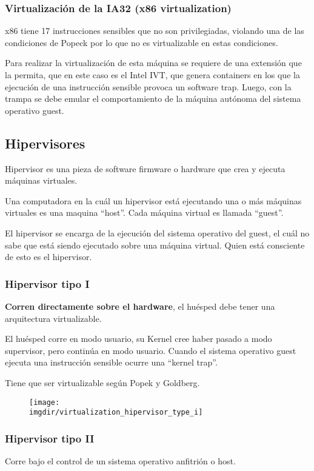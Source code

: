 \documentclass[a4paper, twoside]{article}
\newcommand{\imgdir}{../resources/images} %
\begin{document}
\subsubsection{Virtualización de la IA32 (x86 virtualization)}
x86 tiene 17 instrucciones sensibles que no son privilegiadas, violando una de las condiciones de Popeck por lo que no es virtualizable en estas condiciones.

Para realizar la virtualización de esta máquina se requiere de una extensión que la permita, que en este caso es el Intel IVT, que genera containers en los que la ejecución de una instrucción sensible provoca un software trap. Luego, con la trampa se debe emular el comportamiento de la máquina autónoma del sistema operativo guest.

\subsection{Hipervisores}
Hipervisor es una pieza de software firmware o hardware que crea y ejecuta máquinas virtuales.

Una computadora en la cuál un hipervisor está ejecutando una o más máquinas virtuales es una maquina ``host''. Cada máquina virtual es llamada ``guest''.

El hipervisor se encarga de la ejecución del sistema operativo del guest, el cuál no sabe que está siendo ejecutado sobre una máquina virtual. Quien está consciente de esto es el hipervisor.

\subsubsection{Hipervisor tipo I}
\textbf{Corren directamente sobre el hardware}, el huésped debe tener una arquitectura virtualizable.

El huésped corre en modo usuario, su Kernel cree haber pasado a modo supervisor, pero continúa en modo usuario.
Cuando el sistema operativo guest ejecuta una instrucción sensible ocurre una ``kernel trap''.

Tiene que ser virtualizable según Popek y Goldberg.

\begin{figure}[h]
	\centering
	\texttt{[image: \\imgdir/virtualization\_hipervisor\_type\_i]}
\end{figure}

\subsubsection{Hipervisor tipo II}
Corre bajo el control de un sistema operativo anfitrión o host. 
\end{document}
